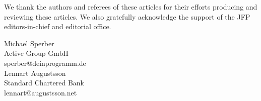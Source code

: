 \documentclass{jfp1}
\begin{document}
We thank the authors and referees of these articles for their efforts
producing and reviewing these articles.  We also gratefully
acknowledge the support of the JFP editors-in-chief and editorial
office.

\begin{flushright}
 Michael Sperber\\
  Active Group GmbH\\
  sperber@deinprogramm.de\\[2mm]
  Lennart Augustsson\\
  Standard Chartered Bank\\
  lennart@augustsson.net
\end{flushright}
\end{document}
